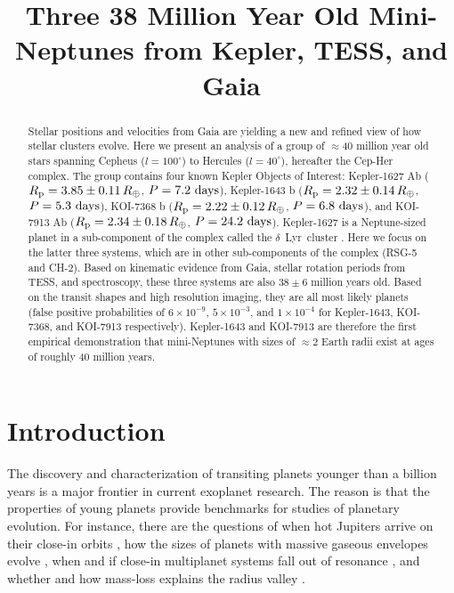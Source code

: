 \documentclass[12pt,twocolumn,linenumbers]{aastex63}
\begin{document}
\title{
  Three 38 Million Year Old Mini-Neptunes from Kepler, TESS, and Gaia
}



\begin{abstract}
  Stellar positions and velocities from Gaia are yielding a new and
  refined view of how stellar clusters evolve.
  Here we present an analysis of a group of $\approx$40 million
  year old stars spanning Cepheus ($l=100^\circ$) to Hercules
  ($l=40^\circ$), hereafter the Cep-Her complex.  The group contains
  four known Kepler Objects of Interest:
  Kepler-1627 Ab ($R_{\rm p} = 3.85 \pm 0.11\,R_\oplus$, $P = 7.2\ {\rm days}$),
  Kepler-1643 b ($R_{\rm p} = 2.32 \pm 0.14\,R_\oplus$, $P = 5.3\ {\rm days}$),
  KOI-7368 b ($R_{\rm p} = 2.22 \pm 0.12\,R_\oplus$, $P = 6.8\ {\rm days}$), and
  KOI-7913 Ab ($R_{\rm p} = 2.34 \pm 0.18\,R_\oplus$, $P = 24.2\ {\rm days}$).
  Kepler-1627 is a Neptune-sized planet in a sub-component of the
  complex called the $\delta$\ Lyr\ cluster
  \citep{bouma_kep1627_2022}.  Here we focus on the latter three
  systems, which are in other sub-components of the complex (RSG-5 and
  CH-2).  Based on kinematic evidence from Gaia, stellar rotation
  periods from TESS, and spectroscopy, these three systems are also
  $38 \pm 6$ million years old.  Based on the transit shapes and high
  resolution imaging, they are all most
  likely planets (false positive probabilities of $6\times10^{-9}$,
  $5\times10^{-3}$, and $1\times10^{-4}$ for Kepler-1643, KOI-7368,
  and KOI-7913 respectively).  Kepler-1643 and KOI-7913 are therefore
  the first empirical demonstration that mini-Neptunes with sizes of
  $\approx$2 Earth radii exist at ages of roughly 40 million years.
\end{abstract}





\section{Introduction}

The discovery and characterization of transiting planets younger than
a billion years is a major frontier in current exoplanet research.
The reason is that the properties of young planets provide benchmarks
for studies of planetary evolution.  For instance, there are the
questions of when hot Jupiters arrive on their close-in orbits
\citep{dawson_johnson_2018}, how the sizes of planets with massive
gaseous envelopes evolve \citep{rizzuto_tess_2020}, when and if
close-in multiplanet systems fall out of resonance
\citep{arevalo_stability_2022,goldberg_architectures_2022},
and whether and how mass-loss explains the radius valley
\citep{lopez_how_2012,Owen_Wu_2013,Fulton_et_al_2017,ginzburg_corepowered_2018,lee_primordial_2021}.
\end{document}
